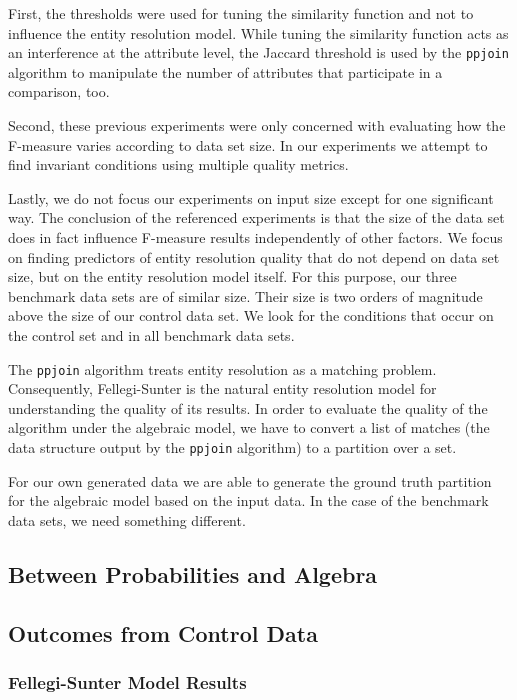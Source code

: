 First, the thresholds were used for tuning the similarity function and not to
influence the entity resolution model.
While tuning the similarity function acts as an interference at the attribute
level, the Jaccard threshold is used by the \texttt{ppjoin} algorithm
to manipulate the number of attributes that participate in a comparison, too.

Second, these previous experiments were only concerned with evaluating how the
F-measure varies according to data set size.
In our experiments we attempt to find invariant conditions using multiple
quality metrics.
 
Lastly, we do not focus our experiments on input size except for one significant
way.
The conclusion of the referenced experiments is that the size of the data set
does in fact influence F-measure results independently of other factors.
We focus on finding predictors of entity resolution quality that do not depend
on data set size, but on the entity resolution model itself.
For this purpose, our three benchmark data sets are of similar size.
Their size is two orders of magnitude above the size of our control data set.
We look for the conditions that occur on the control set and in all benchmark
data sets.

The \texttt{ppjoin} algorithm treats entity resolution as a matching problem.
Consequently, Fellegi-Sunter is the natural entity resolution model for
understanding the quality of its results.
In order to evaluate the quality of the algorithm under the algebraic model, we
have to convert a list of matches (the data structure output by the \texttt{ppjoin}
algorithm) to a partition over a set.

For our own generated data we are able to generate the ground truth partition
for the algebraic model based on the input data.
In the case of the benchmark data sets, we need something different.

\subsection{Between Probabilities and Algebra}\label{subsec:fsm-alg}


\subsection{Outcomes from Control Data}\label{subsec:experiment-mini-buy}

\subsubsection{Fellegi-Sunter Model Results}

